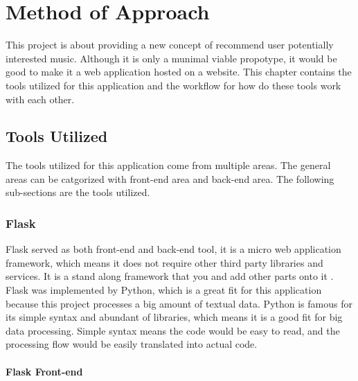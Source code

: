 \chapter{Method of Approach}
\label{ch:method}


This project is about providing a new concept of recommend user potentially interested
music. Although it is only a munimal viable propotype, it would be good to make
it a web application hosted on a website. This chapter contains the tools utilized
for this application and the workflow for how do these tools work with each other.

\section{Tools Utilized}

The tools utilized for this application come from multiple areas. The general areas
can be catgorized with front-end area and back-end area. The following sub-sections
are the tools utilized.

\subsection{Flask}

Flask served as both front-end and back-end tool, it is a micro web application
framework, which means it does not require other third party libraries and services.
It is a stand along framework that you and add other parts onto it \cite{flask-documentation}.
Flask was implemented by Python, which is a great fit for this application because
this project processes a big amount of textual data. Python is famous for its
simple syntax and abundant of libraries, which means it is a good fit for big data
processing. Simple syntax means the code would be easy to read, and the processing
flow would be easily translated into actual code.

\subsubsection{Flask Front-end}

